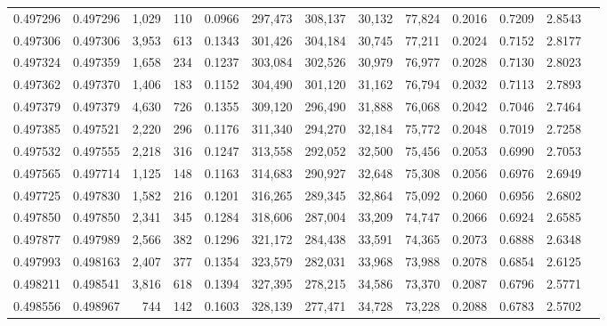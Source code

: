 \begin{tabular}{rrrrrrrrrrrrr}
0.497296 & 0.497296 & 1,029 &   110 &                                     0.0966 & 297,473 & 308,137 &  30,132 &  77,824 & 0.2016 & 0.7209 & 2.8543 \\
0.497306 & 0.497306 & 3,953 &   613 &                                     0.1343 & 301,426 & 304,184 &  30,745 &  77,211 & 0.2024 & 0.7152 & 2.8177 \\
0.497324 & 0.497359 & 1,658 &   234 &                                     0.1237 & 303,084 & 302,526 &  30,979 &  76,977 & 0.2028 & 0.7130 & 2.8023 \\
0.497362 & 0.497370 & 1,406 &   183 &                                     0.1152 & 304,490 & 301,120 &  31,162 &  76,794 & 0.2032 & 0.7113 & 2.7893 \\
0.497379 & 0.497379 & 4,630 &   726 &                                     0.1355 & 309,120 & 296,490 &  31,888 &  76,068 & 0.2042 & 0.7046 & 2.7464 \\
0.497385 & 0.497521 & 2,220 &   296 &                                     0.1176 & 311,340 & 294,270 &  32,184 &  75,772 & 0.2048 & 0.7019 & 2.7258 \\
0.497532 & 0.497555 & 2,218 &   316 &                                     0.1247 & 313,558 & 292,052 &  32,500 &  75,456 & 0.2053 & 0.6990 & 2.7053 \\
0.497565 & 0.497714 & 1,125 &   148 &                                     0.1163 & 314,683 & 290,927 &  32,648 &  75,308 & 0.2056 & 0.6976 & 2.6949 \\
0.497725 & 0.497830 & 1,582 &   216 &                                     0.1201 & 316,265 & 289,345 &  32,864 &  75,092 & 0.2060 & 0.6956 & 2.6802 \\
0.497850 & 0.497850 & 2,341 &   345 &                                     0.1284 & 318,606 & 287,004 &  33,209 &  74,747 & 0.2066 & 0.6924 & 2.6585 \\
0.497877 & 0.497989 & 2,566 &   382 &                                     0.1296 & 321,172 & 284,438 &  33,591 &  74,365 & 0.2073 & 0.6888 & 2.6348 \\
0.497993 & 0.498163 & 2,407 &   377 &                                     0.1354 & 323,579 & 282,031 &  33,968 &  73,988 & 0.2078 & 0.6854 & 2.6125 \\
0.498211 & 0.498541 & 3,816 &   618 &                                     0.1394 & 327,395 & 278,215 &  34,586 &  73,370 & 0.2087 & 0.6796 & 2.5771 \\
0.498556 & 0.498967 &   744 &   142 &                                     0.1603 & 328,139 & 277,471 &  34,728 &  73,228 & 0.2088 & 0.6783 & 2.5702 \\

\end{tabular}
